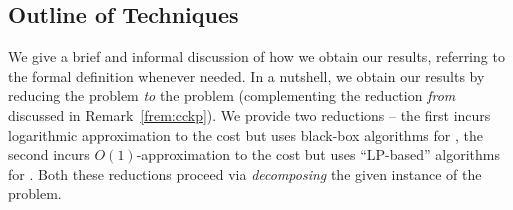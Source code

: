 %
%

\subsection{Outline of Techniques} \label{fsec:overview}
We give a brief and informal discussion of how we obtain our results, referring to the formal definition whenever needed.
In a nutshell, we obtain our results by reducing the \mckc problem {\em to} the \cckp problem (complementing the reduction {\em from} discussed in Remark~\ref{frem:cckp}).
We provide two reductions -- the first incurs logarithmic approximation to the cost but uses black-box algorithms for \cckp, the second incurs $O(1)$-approximation to the cost but uses ``LP-based'' algorithms for \cckp.
Both these reductions proceed via {\em decomposing} the given instance of the \mckc problem. %

